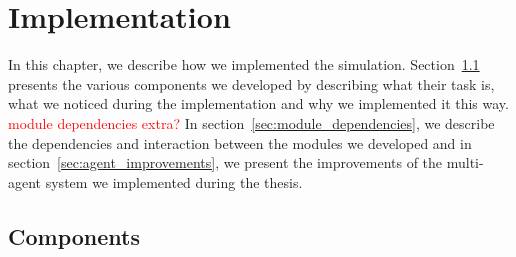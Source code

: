 \chapter{Implementation}
\label{cha:implementation}
In this chapter, we describe how we implemented the simulation. Section~\ref{sec:components} presents the various components we developed by describing what their task is, what we noticed during the implementation and why we implemented it this way. \textcolor{red}{module dependencies extra?} In section~\ref{sec:module_dependencies}, we describe the dependencies and interaction between the modules we developed and in section~\ref{sec:agent_improvements}, we present the improvements of the multi-agent system we implemented during the thesis.

\section{Components}
\label{sec:components}
